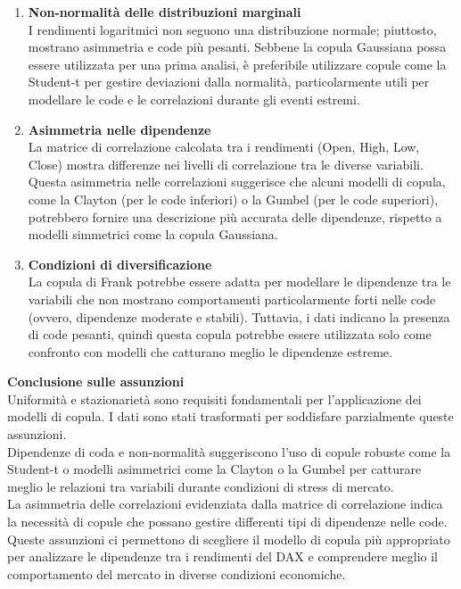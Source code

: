 \documentclass[a4paper,12pt]{article}
\begin{document}
\begin{enumerate}
	\item \textbf{Non-normalità delle distribuzioni marginali}\\
	I rendimenti logaritmici non seguono una distribuzione normale; piuttosto, mostrano asimmetria e code più pesanti. Sebbene la copula Gaussiana possa essere utilizzata per una prima analisi, è preferibile utilizzare copule come la Student-t per gestire deviazioni dalla normalità, particolarmente utili per modellare le code e le correlazioni durante gli eventi estremi.
	\item \textbf{Asimmetria nelle dipendenze}\\
	La matrice di correlazione calcolata tra i rendimenti (Open, High, Low, Close) mostra differenze nei livelli di correlazione tra le diverse variabili. Questa asimmetria nelle correlazioni suggerisce che alcuni modelli di copula, come la Clayton (per le code inferiori) o la Gumbel (per le code superiori), potrebbero fornire una descrizione più accurata delle dipendenze, rispetto a modelli simmetrici come la copula Gaussiana.
	\item \textbf{Condizioni di diversificazione}\\
	La copula di Frank potrebbe essere adatta per modellare le dipendenze tra le variabili che non mostrano comportamenti particolarmente forti nelle code (ovvero, dipendenze moderate e stabili). Tuttavia, i dati indicano la presenza di code pesanti, quindi questa copula potrebbe essere utilizzata solo come confronto con modelli che catturano meglio le dipendenze estreme.
\end{enumerate}

\noindent\textbf{Conclusione sulle assunzioni}\\

\noindent Uniformità e stazionarietà sono requisiti fondamentali per l'applicazione dei modelli di copula. I dati sono stati trasformati per soddisfare parzialmente queste assunzioni.\\
Dipendenze di coda e non-normalità suggeriscono l'uso di copule robuste come la Student-t o modelli asimmetrici come la Clayton o la Gumbel per catturare meglio le relazioni tra variabili durante condizioni di stress di mercato.\\
La asimmetria delle correlazioni evidenziata dalla matrice di correlazione indica la necessità di copule che possano gestire differenti tipi di dipendenze nelle code.\\
Queste assunzioni ci permettono di scegliere il modello di copula più appropriato per analizzare le dipendenze tra i rendimenti del DAX e comprendere meglio il comportamento del mercato in diverse condizioni economiche.
\end{document}
